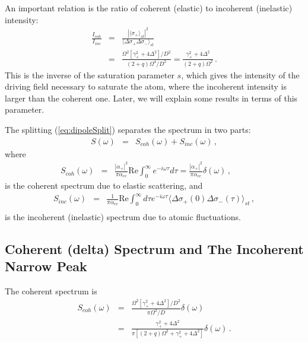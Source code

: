 \documentclass[twocolumn,aps,eqsecnum,showkeys,amsmath]{revtex4-2}
\begin{document}
An important relation is the ratio of coherent (elastic) to incoherent 
(inelastic) intensity: 
%
\begin{eqnarray} 
\frac{I_{coh}}{I_{inc}} &=& \frac{|\langle \sigma_+  \rangle_{st}|^2}
	{\langle \Delta \sigma_+ \Delta \sigma_- \rangle_{st}}		\\ 
&=& \frac{ \Omega^2 [\gamma_+^2 +4\Delta^2]/D^2 }
	{(2+q) \Omega^4 /D^2} 
	= \frac{ \gamma_+^2 +4\Delta^2 }{(2+q) \Omega^2}  \,. 
	\nonumber 
\end{eqnarray}
This is the inverse of the saturation parameter $s$, which gives the 
intensity of the driving field necessary to saturate the atom, where 
the incoherent intensity is larger than the coherent one. Later, we will 
explain some results in terms of this parameter.

The splitting (\ref{eq:dipoleSplit}) separates the spectrum in two parts: 
%
\begin{eqnarray} 	\label{eq:3LASpectrum?}
S(\omega) &=& S_{coh}(\omega) +S_{inc}(\omega) 	\,,
\end{eqnarray}
where 
%
\begin{eqnarray}
S_{coh}(\omega) &=& \frac{|\alpha_+ |^2}{ \pi \alpha_{ee}  }
	\mathrm{Re} \int_0^{\infty}  e^{-i \omega \tau} d\tau 
	= \frac{|\alpha_+ |^2}{ \pi \alpha_{ee}  } 
	\delta(\omega)	\,, 	\qquad 
\end{eqnarray}
is the coherent spectrum due to elastic scattering, and 
%
\begin{eqnarray} 	\label{eq:Sinc}
S_{inc}(\omega) 
&=& \frac{1}{ \pi \alpha_{ee}  } \mathrm{Re} \int_0^{\infty} 
	d\tau e^{-i \omega \tau} 
	\langle \Delta \sigma_+(0) \Delta \sigma_-(\tau) \rangle_{st} 
	\,, 	\nonumber \\
\end{eqnarray}
is the incoherent (inelastic) spectrum due to atomic fluctuations.  

\subsection{Coherent (delta) Spectrum and The Incoherent Narrow Peak}
The coherent spectrum is 
%
\begin{eqnarray} 	\label{eq:SCoh3LA}
S_{coh}(\omega) 
&=& \frac{ \Omega^2[\gamma_+^2 +4\Delta^2]/D^2 }
    {\pi \Omega^2/D} \delta(\omega)	    \\
   &=& \frac{ \gamma_+^2 +4\Delta^2 }
    {\pi [(2+q)\Omega^2 +\gamma_+^2 +4\Delta^2 ] } \delta(\omega)	   \,. 
    \nonumber 	 
\end{eqnarray}
\end{document}
